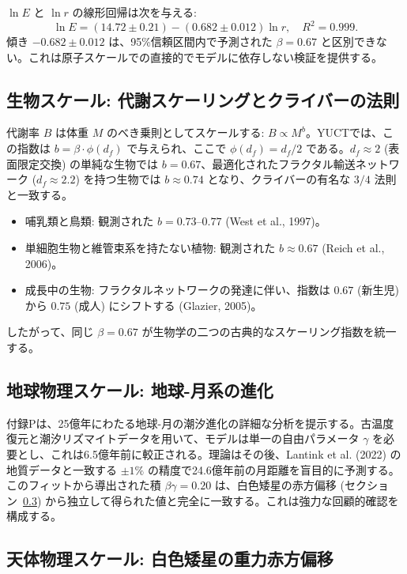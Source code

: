 \documentclass[11pt,a4paper]{article}
\begin{document}
	$\ln E$ と $\ln r$ の線形回帰は次を与える:
	\[
	\ln E = (14.72 \pm 0.21) - (0.682 \pm 0.012) \ln r, \quad R^2 = 0.999.
	\]
	傾き $-0.682 \pm 0.012$ は、95\%信頼区間内で予測された $\beta = 0.67$ と区別できない。これは原子スケールでの直接的でモデルに依存しない検証を提供する。
	
	\subsection{生物スケール: 代謝スケーリングとクライバーの法則}
	\label{subsec:metabolic-scaling}
	
	代謝率 $B$ は体重 $M$ のべき乗則としてスケールする: $B \propto M^{b}$。YUCTでは、この指数は $b = \beta \cdot \phi(d_f)$ で与えられ、ここで $\phi(d_f) = d_f/2$ である。$d_f \approx 2$ (表面限定交換) の単純な生物では $b = 0.67$、最適化されたフラクタル輸送ネットワーク ($d_f \approx 2.2$) を持つ生物では $b \approx 0.74$ となり、クライバーの有名な $3/4$ 法則と一致する。
	
	\begin{itemize}
		\item 哺乳類と鳥類: 観測された $b = 0.73$–$0.77$ (West et al., 1997)。
		\item 単細胞生物と維管束系を持たない植物: 観測された $b \approx 0.67$ (Reich et al., 2006)。
		\item 成長中の生物: フラクタルネットワークの発達に伴い、指数は $0.67$ (新生児) から $0.75$ (成人) にシフトする (Glazier, 2005)。
	\end{itemize}
	
	したがって、同じ $\beta = 0.67$ が生物学の二つの古典的なスケーリング指数を統一する。
	
	\subsection{地球物理スケール: 地球-月系の進化}
	\label{subsec:earth-moon}
	
	付録Pは、25億年にわたる地球-月の潮汐進化の詳細な分析を提示する。古温度復元と潮汐リズマイトデータを用いて、モデルは単一の自由パラメータ $\gamma$ を必要とし、これは6.5億年前に較正される。理論はその後、Lantink et al. (2022) の地質データと一致する $\pm 1\%$ の精度で24.6億年前の月距離を盲目的に予測する。このフィットから導出された積 $\beta\gamma = 0.20$ は、白色矮星の赤方偏移 (セクション~\ref{subsec:wd}) から独立して得られた値と完全に一致する。これは強力な回顧的確認を構成する。
	
	\subsection{天体物理スケール: 白色矮星の重力赤方偏移}
	\label{subsec:wd}
	
\end{document}
